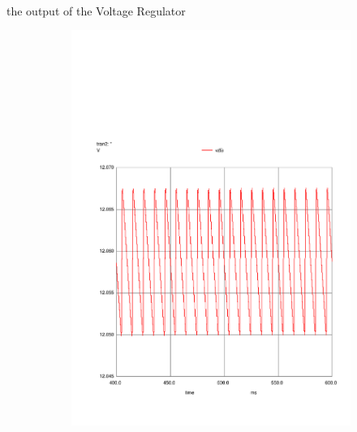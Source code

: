 \paragraph{} the output of the Voltage Regulator
\vspace{1mm}
\begin{figure}[h]
    \centering
    \begin{subfigure}{0.23\textwidth}
        \includegraphics[width=1.5\linewidth, clip]{../sim/vreg.pdf}
        \label{fig:PStime}
    \end{subfigure}
    \begin{subfigure}{0.23\textwidth}

\end{subfigure}
\end{figure}
